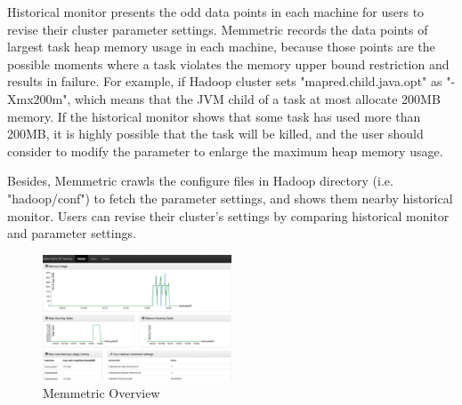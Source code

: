 Historical monitor presents the odd data points in each machine for users to revise their cluster parameter settings. Memmetric records the data points of largest task heap memory usage in each machine, because those points are the possible moments where a task violates the memory upper bound restriction and results in failure. For example, if Hadoop cluster sets "mapred.child.java.opt" as "-Xmx200m", which means that  the JVM child of a task at most allocate 200MB memory. If the historical monitor shows that some task has used more than 200MB, it is highly possible that the task will be killed, and the user should consider to modify the parameter to enlarge the maximum heap memory usage.

Besides, Memmetric crawls the configure files in Hadoop directory (i.e. "hadoop/conf") to fetch the parameter settings, and shows them nearby historical monitor. Users can revise their cluster's settings by comparing historical monitor and parameter settings. 

\begin{figure}[h!]
  \caption{Memmetric Overview}
  \centering
    \includegraphics[width=0.5\textwidth]{image/overview.png}
\end{figure}

